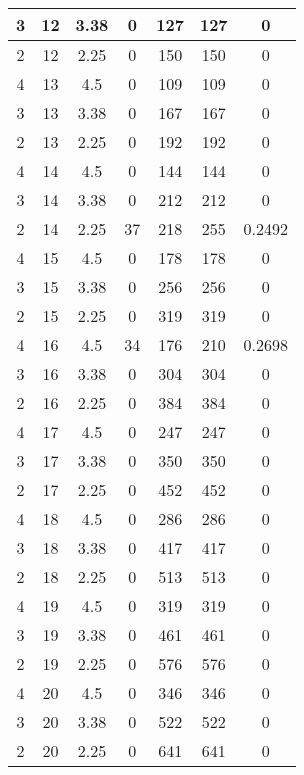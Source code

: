 \documentclass[letterpaper, 12pt]{article}
\begin{document}
\begin{longtable}{|c|c|c|c|c|c|c|}
\hline
3 & 12 & 3.38 & 0 & 127 & 127 & 0 \\
\hline
2 & 12 & 2.25 & 0 & 150 & 150 & 0 \\
\hline
4 & 13 & 4.5 & 0 & 109 & 109 & 0 \\
\hline
3 & 13 & 3.38 & 0 & 167 & 167 & 0 \\
\hline
2 & 13 & 2.25 & 0 & 192 & 192 & 0 \\
\hline
4 & 14 & 4.5 & 0 & 144 & 144 & 0 \\
\hline
3 & 14 & 3.38 & 0 & 212 & 212 & 0 \\
\hline
2 & 14 & 2.25 & 37 & 218 & 255 & 0.2492 \\
\hline
4 & 15 & 4.5 & 0 & 178 & 178 & 0 \\
\hline
3 & 15 & 3.38 & 0 & 256 & 256 & 0 \\
\hline
2 & 15 & 2.25 & 0 & 319 & 319 & 0 \\
\hline
4 & 16 & 4.5 & 34 & 176 & 210 & 0.2698 \\
\hline
3 & 16 & 3.38 & 0 & 304 & 304 & 0 \\
\hline
2 & 16 & 2.25 & 0 & 384 & 384 & 0 \\
\hline
4 & 17 & 4.5 & 0 & 247 & 247 & 0 \\
\hline
3 & 17 & 3.38 & 0 & 350 & 350 & 0 \\
\hline
2 & 17 & 2.25 & 0 & 452 & 452 & 0 \\
\hline
4 & 18 & 4.5 & 0 & 286 & 286 & 0 \\
\hline
3 & 18 & 3.38 & 0 & 417 & 417 & 0 \\
\hline
2 & 18 & 2.25 & 0 & 513 & 513 & 0 \\
\hline
4 & 19 & 4.5 & 0 & 319 & 319 & 0 \\
\hline
3 & 19 & 3.38 & 0 & 461 & 461 & 0 \\
\hline
2 & 19 & 2.25 & 0 & 576 & 576 & 0 \\
\hline
4 & 20 & 4.5 & 0 & 346 & 346 & 0 \\
\hline
3 & 20 & 3.38 & 0 & 522 & 522 & 0 \\
\hline
2 & 20 & 2.25 & 0 & 641 & 641 & 0 \\
\hline
\end{longtable}
\end{document}
